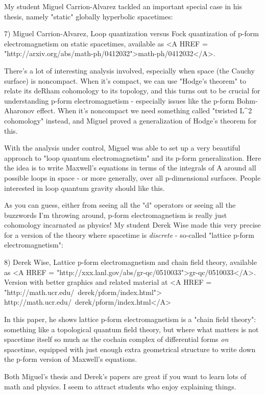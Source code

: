 My student Miguel Carrion-Alvarez tackled an important special case 
in his thesis, namely "static" globally hyperbolic spacetimes: 
 
7) Miguel Carrion-Alvarez, Loop quantization versus Fock quantization 
of p-form electromagnetism on static spacetimes, available as 
<A HREF = "http://arxiv.org/abs/math-ph/0412032">math-ph/0412032</A>.   

There's a lot of interesting analysis involved, especially when space
(the Cauchy surface) is noncompact.  When it's compact, we can use 
"Hodge's theorem" to relate its deRham cohomology to its topology, 
and this turns out to be crucial for understanding p-form electromagnetism - 
especially issues like the p-form Bohm-Aharonov effect.  When it's 
noncompact we need something called "twisted L^{2} 
cohomology" instead, 
and Miguel proved a generalization of Hodge's theorem for this.  

With the analysis under control, Miguel was able to set up a very 
beautiful approach to  "loop quantum electromagnetism" and its p-form 
generalization.  Here the idea is to write Maxwell's equations in terms 
of the integrals of A around all possible loops in space - or more 
generally, over all p-dimensional surfaces.  People interested in loop
quantum gravity should like this.

As you can guess, either from seeing all the "d" operators or seeing all
the buzzwords I'm throwing around, p-form electromagnetism is really just
cohomology incarnated as physics!  My student Derek Wise made this very
precise for a version of the theory where spacetime is \emph{discrete} -
so-called "lattice p-form electromagnetism":

8) Derek Wise, Lattice p-form electromagnetism and chain field
theory, available as <A HREF = "http://xxx.lanl.gov/abs/gr-qc/0510033">gr-qc/0510033</A>.  Version with better graphics
and related material at 
<A HREF = "http://math.ucr.edu/~derek/pform/index.html">
http://math.ucr.edu/~derek/pform/index.html</A>

In this paper, he shows lattice p-form electromagnetism is a "chain
field theory": something like a topological quantum field theory, but 
where what matters is not spacetime itself so much as the cochain 
complex of differential forms \emph{on} spacetime, equipped with just enough
extra geometrical structure to write down the p-form version of Maxwell's
equations.

Both Miguel's thesis and Derek's papers are great if you want to learn 
lots of math and physics.  I seem to attract students who enjoy explaining 
things.  

